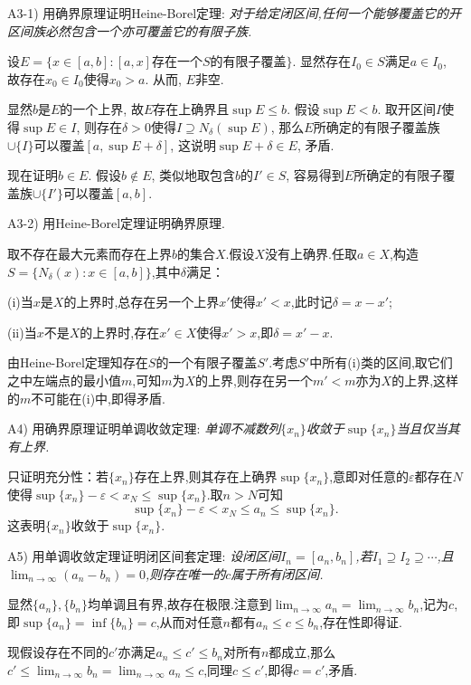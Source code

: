 A3-1) 用确界原理证明Heine-Borel定理: \textit{ 对于给定闭区间,任何一个能够覆盖它的开区间族必然包含一个亦可覆盖它的有限子族. }

\begin{solution}
	设$E=\{ x \in [a,b]:[a,x]\text{存在一个$S$的有限子覆盖} \}$. 显然存在$I_0 \in S$满足$a \in I_0$, 故存在$x_0 \in I_0$使得$x_0>a$. 从而, $E$非空. 
	
	显然$b$是$E$的一个上界, 故$E$存在上确界且$\sup E \leq b$. 假设$\sup E < b$. 取开区间$I$使得$\sup E \in I$, 则存在$\delta >0$使得$I \supseteq N_{\delta}(\sup E)$, 那么$E$所确定的有限子覆盖族$\cup \{ I \}$可以覆盖$[a,\sup E+\delta]$, 这说明$\sup E+\delta \in E$, 矛盾. 
	
	现在证明$b \in E$. 假设$b \notin E$, 类似地取包含$b$的$I' \in S$, 容易得到$E$所确定的有限子覆盖族$\cup \{ I' \}$可以覆盖$[a,b]$. 
\end{solution}


A3-2) 用Heine-Borel定理证明确界原理. 

\begin{solution}
	取不存在最大元素而存在上界$b$的集合$X$.假设$X$没有上确界.任取$a \in X$,构造$S=\{ N_{\delta}(x):x \in [a,b] \}$,其中$\delta$满足：
	
	(i)当$x$是$X$的上界时,总存在另一个上界$x'$使得$x'<x$,此时记$\delta =x-x'$;
	
	(ii)当$x$不是$X$的上界时,存在$x' \in X$使得$x'>x$,即$\delta = x'-x$.
	
	由Heine-Borel定理知存在$S$的一个有限子覆盖$S'$.考虑$S'$中所有(i)类的区间,取它们之中左端点的最小值$m$,可知$m$为$X$的上界,则存在另一个$m'<m$亦为$X$的上界,这样的$m$不可能在(i)中,即得矛盾.
\end{solution}

A4) 用确界原理证明单调收敛定理: \textit{单调不减数列$\{ x_n \}$收敛于$\sup \{ x_n \}$当且仅当其有上界. }

\begin{solution}
	只证明充分性：若$\{ x_n \}$存在上界,则其存在上确界$\sup \{ x_n \}$,意即对任意的$\varepsilon$都存在$N$使得$\sup \{x_n\}-\varepsilon < x_N \leq \sup \{ x_n \}$.取$n>N$可知$$\sup \{x_n\}-\varepsilon < x_N \leq a_n \leq \sup \{ x_n \}.$$
	这表明$\{ x_n \}$收敛于$\sup \{ x_n \}$.
\end{solution}

A5) 用单调收敛定理证明闭区间套定理: \textit{设闭区间$I_n=[a_n,b_n]$,若$I_1 \supseteq I_2 \supseteq \cdots $,且$\lim_{n\to \infty} (a_n-b_n)=0$,则存在唯一的$c$属于所有闭区间. }

\begin{solution}
	显然$\{ a_n \},\{ b_n \}$均单调且有界,故存在极限.注意到$\lim_{n\to \infty} a_n = \lim_{n\to \infty} b_n$,记为$c$,即$\sup \{ a_n \} = \inf \{ b_n \} = c$,从而对任意$n$都有$a_n \leq c \leq b_n$,存在性即得证.
	
	现假设存在不同的$c'$亦满足$a_n \leq c' \leq b_n$对所有$n$都成立,那么$c' \leq \lim_{n\to \infty} b_n = \lim_{n\to \infty} a_n \leq c$,同理$c \leq c'$,即得$c=c'$,矛盾.
\end{solution}

